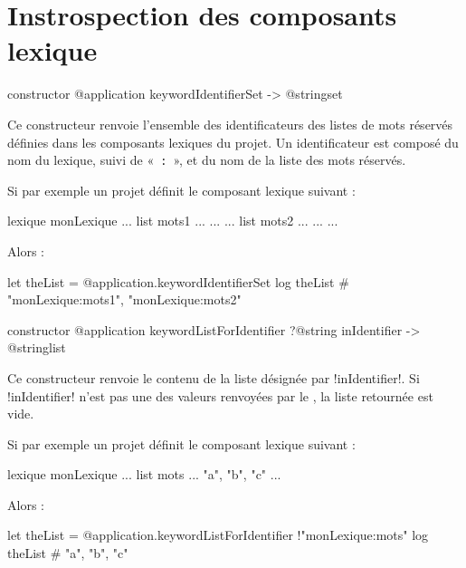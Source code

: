 \section{Instrospection des composants lexique}


\begin{galgasbox}
constructor @application keywordIdentifierSet -> @stringset
\end{galgasbox}


Ce constructeur renvoie l'ensemble des identificateurs des listes de mots réservés définies dans les composants lexiques du projet. Un identificateur est composé du nom du lexique, suivi de «~\texttt{:}~», et du nom de la liste des mots réservés.


Si par exemple un projet définit le composant lexique suivant :

\begin{galgas}
lexique monLexique {
  ...
  list mots1 ... { ... }
  ...
  list mots2 ... { ... }
  ...
}
\end{galgas}

Alors :
\begin{galgas}
let theList = @application.keywordIdentifierSet
log theList # "monLexique:mots1", "monLexique:mots2"
\end{galgas}






\begin{galgasbox}
constructor @application keywordListForIdentifier
  ?@string inIdentifier
  -> @stringlist
\end{galgasbox}


Ce constructeur renvoie le contenu de la liste désignée par \ggs!inIdentifier!. Si \ggs!inIdentifier! n'est pas une des valeurs renvoyées par le , la liste retournée est vide.


Si par exemple un projet définit le composant lexique suivant :

\begin{galgas}
lexique monLexique {
  ...
  list mots ... { "a", "b", "c" }
  ...
}
\end{galgas}

Alors :
\begin{galgas}
let theList = @application.keywordListForIdentifier {!"monLexique:mots"}
log theList # "a", "b", "c"
\end{galgas}



